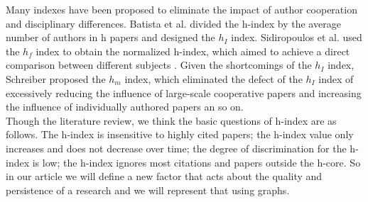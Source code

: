 \documentclass[times, twoside]{zHenriquesLab-StyleBioRxiv}
\begin{document}
Many indexes have been proposed to eliminate the impact of author cooperation and disciplinary differences. Batista et al. \cite{batista2006possible} divided the h-index by the average number of authors in h papers and designed the $h_{I}$ index. Sidiropoulos et al. used the $h_{f}$ index to obtain the normalized h-index, which aimed to achieve a direct comparison between different subjects \cite{sidiropoulos2007generalized}. Given the shortcomings of the $h_{I}$ index, Schreiber \cite{schreiber2008share} proposed the $h_{m}$ index, which eliminated the defect of the $h_{I}$ index of excessively reducing the influence of large-scale cooperative papers and increasing the influence of individually authored papers an so on.\\
Though the literature review, we think the basic questions of h-index are as follows. The h-index is insensitive to highly cited papers; the h-index value only increases and does not decrease over time; the degree of discrimination for the h-index is low; the h-index ignores most citations and papers outside the h-core. So in our article we will define a new factor that acts about the quality and persistence of a research and we will represent that using graphs.  
\end{document}

